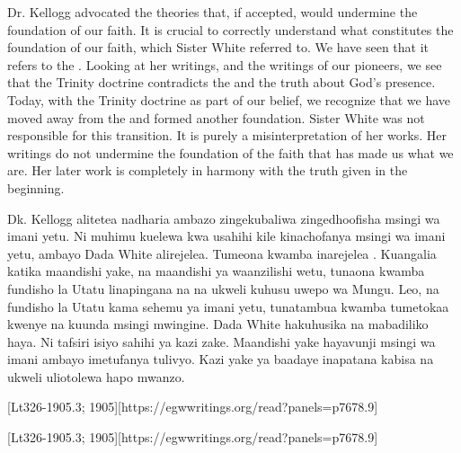 Dr. Kellogg advocated the theories that, if accepted, would undermine the foundation of our faith. It is crucial to correctly understand what constitutes the foundation of our faith, which Sister White referred to. We have seen that it refers to the . Looking at her writings, and the writings of our pioneers, we see that the Trinity doctrine contradicts the  and the truth about God’s presence. Today, with the Trinity doctrine as part of our belief, we recognize that we have moved away from the  and formed another foundation. Sister White was not responsible for this transition. It is purely a misinterpretation of her works. Her writings do not undermine the foundation of the faith that has made us what we are. Her later work is completely in harmony with the truth given in the beginning.


Dk. Kellogg alitetea nadharia ambazo zingekubaliwa zingedhoofisha msingi wa imani yetu. Ni muhimu kuelewa kwa usahihi kile kinachofanya msingi wa imani yetu, ambayo Dada White alirejelea. Tumeona kwamba inarejelea . Kuangalia katika maandishi yake, na maandishi ya waanzilishi wetu, tunaona kwamba fundisho la Utatu linapingana na  na ukweli kuhusu uwepo wa Mungu. Leo, na fundisho la Utatu kama sehemu ya imani yetu, tunatambua kwamba tumetokaa kwenye  na kuunda msingi mwingine. Dada White hakuhusika na mabadiliko haya. Ni tafsiri isiyo sahihi ya kazi zake. Maandishi yake hayavunji msingi wa imani ambayo imetufanya tulivyo. Kazi yake ya baadaye inapatana kabisa na ukweli uliotolewa hapo mwanzo.


[Lt326-1905.3; 1905][https://egwwritings.org/read?panels=p7678.9]


[Lt326-1905.3; 1905][https://egwwritings.org/read?panels=p7678.9]


